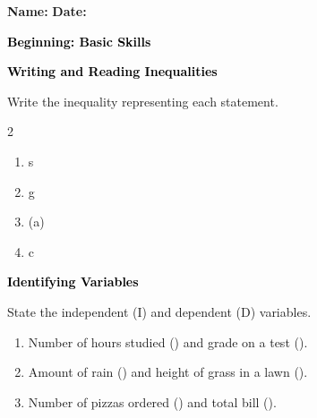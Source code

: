 \documentclass[12pt, letterpaper, fleqn]{article}
\newcommand{\blank}{\underline{\hspace{2.2cm}}}
\begin{document}
\textbf{Name:} \underline{\hspace{5cm}}
\hfill
\textbf{Date:} \underline{\hspace{3cm}}\\

\begin{tcolorbox}[colback=customteal!20]
    \large\textcolor{black}{\textbf{Beginning: Basic Skills}}
\end{tcolorbox}

\vspace{3mm}

\begin{tcolorbox}[colback=customteal!20]
\large\textcolor{black}{\textbf{Writing and Reading Inequalities}}
\end{tcolorbox}

\noindent
Write the inequality representing each statement.

\vspace{3mm}
\begin{multicols}{2}
\begin{enumerate}[itemsep=1cm, leftmargin=0.6cm]
\item {} s  \rightarrow \blank
\item {} g  \rightarrow \blank
\item {} (a) \rightarrow \blank
\item {} c  \rightarrow \blank
\end{enumerate}
\end{multicols}
\newpage

\begin{tcolorbox}[colback=customteal!20]
\large\textcolor{black}{\textbf{Identifying Variables}}
\end{tcolorbox}

\noindent
State the independent (I) and dependent (D) variables.

\vspace{3mm}
\begin{enumerate}[itemsep=1cm, leftmargin=0.6cm]
\item Number of hours studied (\blank) and grade on a test (\blank).
\item Amount of rain (\blank) and height of grass in a lawn (\blank).
\item Number of pizzas ordered (\blank) and total bill (\blank).
\end{enumerate}
\newpage
\end{document}
